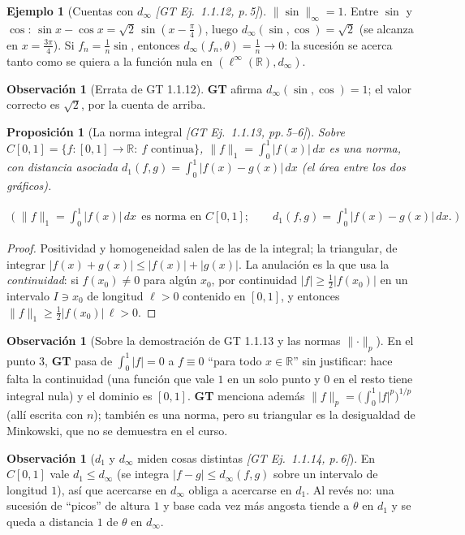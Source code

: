 \documentclass[11pt,a4paper]{article}
\newcommand{\lgc}[1]{\par\vspace{-3pt}\begin{gather*}\big(\;#1\;\big)\end{gather*}\vspace{-6pt}}
\theoremstyle{definition}
\newtheorem{ejemplo}[definicion]{Ejemplo}
\newtheorem{observacion}[definicion]{Observación}
\theoremstyle{plain}
\newtheorem{proposicion}[definicion]{Proposición}
\newcommand{\fnt}[1]{{\normalfont\small\itshape\color{gray!150!black}[#1]}}
\newcommand{\R}{\mathbb{R}}
\newcommand{\norm}[1]{\lVert #1 \rVert}
\begin{document}
\begin{ejemplo}[Cuentas con $d_\infty$ \fnt{GT Ej.\ 1.1.12, p.\,5}]
$\norm{\sin}_\infty=1$. Entre $\sin$ y $\cos$: $\sin x-\cos x=\sqrt2\,\sin(x-\tfrac\pi4)$, luego $d_\infty(\sin,\cos)=\sqrt2$ (se alcanza en $x=\tfrac{3\pi}4$). Si $f_n=\tfrac1n\sin$, entonces $d_\infty(f_n,\theta)=\tfrac1n\to0$: la sucesión se acerca tanto como se quiera a la función nula en $(\ell^\infty(\R),d_\infty)$.
\end{ejemplo}

\begin{observacion}[Errata de GT 1.1.12]
\textbf{GT} afirma $d_\infty(\sin,\cos)=1$; el valor correcto es $\sqrt2$, por la cuenta de arriba.
\end{observacion}

\begin{proposicion}[La norma integral \fnt{GT Ej.\ 1.1.13, pp.\,5--6}]\label{hu:norma1}
Sobre $C[0,1]=\{f:[0,1]\to\R:\ f \text{ continua}\}$, $\norm{f}_1=\int_0^1|f(x)|\,dx$ es una norma, con distancia asociada $d_1(f,g)=\int_0^1|f(x)-g(x)|\,dx$ (el área entre los dos gráficos).
\lgc{\norm{f}_1=\int_0^1|f(x)|\,dx\ \ \text{es norma en } C[0,1];\qquad d_1(f,g)=\int_0^1|f(x)-g(x)|\,dx.}
\end{proposicion}

\begin{proof}
Positividad y homogeneidad salen de las de la integral; la triangular, de integrar $|f(x)+g(x)|\le|f(x)|+|g(x)|$. La anulación es la que usa la \emph{continuidad}: si $f(x_0)\ne0$ para algún $x_0$, por continuidad $|f|\ge\tfrac12|f(x_0)|$ en un intervalo $I\ni x_0$ de longitud $\ell>0$ contenido en $[0,1]$, y entonces $\norm{f}_1\ge\tfrac12|f(x_0)|\,\ell>0$.
\end{proof}

\begin{observacion}[Sobre la demostración de GT 1.1.13 y las normas $\norm{\cdot}_p$]
En el punto 3, \textbf{GT} pasa de $\int_0^1|f|=0$ a $f\equiv0$ ``para todo $x\in\R$'' sin justificar: hace falta la continuidad (una función que vale $1$ en un solo punto y $0$ en el resto tiene integral nula) y el dominio es $[0,1]$. \textbf{GT} menciona además $\norm{f}_p=\big(\int_0^1|f|^p\big)^{1/p}$ (allí escrita con $n$); también es una norma, pero su triangular es la desigualdad de Minkowski, que no se demuestra en el curso.
\end{observacion}

\begin{observacion}[$d_1$ y $d_\infty$ miden cosas distintas \fnt{GT Ej.\ 1.1.14, p.\,6}]
En $C[0,1]$ vale $d_1\le d_\infty$ (se integra $|f-g|\le d_\infty(f,g)$ sobre un intervalo de longitud $1$), así que acercarse en $d_\infty$ obliga a acercarse en $d_1$. Al revés no: una sucesión de ``picos'' de altura $1$ y base cada vez más angosta tiende a $\theta$ en $d_1$ y se queda a distancia $1$ de $\theta$ en $d_\infty$.
\end{observacion}
\end{document}
